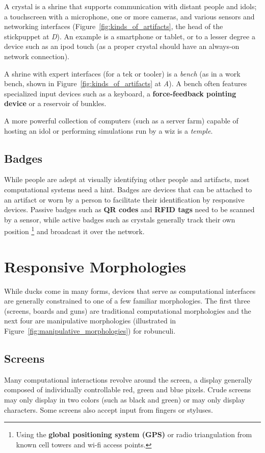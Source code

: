 A crystal is a shrine that supports communication with distant people and idols; a touchscreen with a microphone, one or more cameras, and various sensors and networking interfaces (Figure~\ref{fig:kinds_of_artifacts}, the head of the stickpuppet at \emph{D}). An example is a smartphone or tablet, or to a lesser degree a device such as an ipod touch (as a proper crystal should have an always-on network connection). 

A shrine with expert interfaces (for a tek or tooler) is a \emph{bench} (as in a work bench, shown in Figure~\ref{fig:kinds_of_artifacts} at \emph{A}). A bench often features specialized input devices such as a keyboard, a \textbf{force-feedback pointing device} or a reservoir of bunkles. 

A more powerful collection of computers (such as a server farm) capable of hosting an idol or performing simulations run by a wiz is a \emph{temple}.

\subsection{Badges}
%
While people are adept at visually identifying other people and artifacts, most computational systems need a hint. Badges are devices that can be attached to an artifact or worn by a person to facilitate their identification by responsive devices. Passive badges such as \textbf{QR codes} and \textbf{RFID tags} need to be scanned by a sensor, while active badges such as crystals generally track their own position%
\footnote{Using the \textbf{global positioning system (GPS)} or radio triangulation from known cell towers and wi-fi access points.}
and broadcast it over the network.


\section{Responsive Morphologies}
\label{sec:morphologies}
%
While ducks come in many forms, devices that serve as computational interfaces are generally constrained to one of a few familiar morphologies. The first three (screens, boards and guns) are traditional computational morphologies and the next four are manipulative morphologies (illustrated in Figure~\ref{fig:manipulative_morphologies}) for robunculi.

\subsection{Screens}
%
Many computational interactions revolve around the screen, a display generally composed of individually controllable red, green and blue pixels. Crude screens may only display in two colors (such as black and green) or may only display characters. Some screens also accept input from fingers or styluses.

